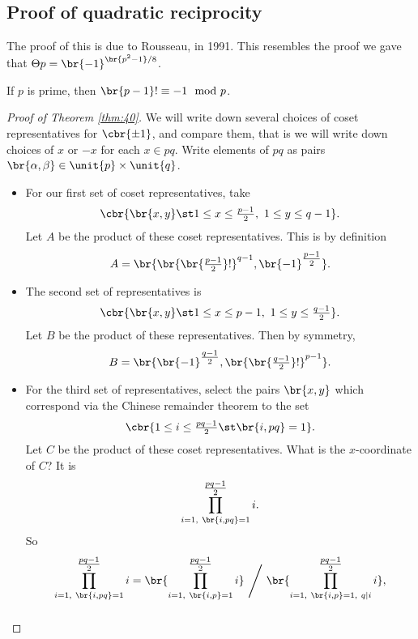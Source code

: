 \pagebreak

\subsection{Proof of quadratic reciprocity}


The proof of this is due to Rousseau, in 1991. This resembles the proof we gave that $ \symbol{2}{p} = \br{-1}^{\br{p^2 - 1} / 8} $.

\begin{theorem}
If $ p $ is prime, then $ \br{p - 1}! \equiv -1 \mod p $.
\end{theorem}

\begin{proof}[Proof of Theorem \ref{thm:40}]
We will write down several choices of coset representatives for $ \cbr{\pm 1} $, and compare them, that is we will write down choices of $ x $ or $ -x $ for each $ x \in \unit{pq} $. Write elements of $ \unit{pq} $ as pairs $ \br{\alpha, \beta} \in \unit{p} \times \unit{q} $.
\begin{itemize}
\item For our first set of coset representatives, take
$$ \cbr{\br{x, y} \st 1 \le x \le \tfrac{p - 1}{2}, \ 1 \le y \le q - 1}. $$
Let $ A $ be the product of these coset representatives. This is by definition
$$ A = \br{\br{\br{\tfrac{p - 1}{2}}!}^{q - 1}, \br{-1}^{\tfrac{p - 1}{2}}}. $$
\item The second set of representatives is
$$ \cbr{\br{x, y} \st 1 \le x \le p - 1, \ 1 \le y \le \tfrac{q - 1}{2}}. $$
Let $ B $ be the product of these representatives. Then by symmetry,
$$ B = \br{\br{-1}^{\tfrac{q - 1}{2}}, \br{\br{\tfrac{q - 1}{2}}!}^{p - 1}}. $$
\item For the third set of representatives, select the pairs $ \br{x, y} $ which correspond via the Chinese remainder theorem to the set
$$ \cbr{1 \le i \le \tfrac{pq - 1}{2} \st \br{i, pq} = 1}. $$
Let $ C $ be the product of these coset representatives. What is the $ x $-coordinate of $ C $? It is
$$ \prod_{i = 1, \ \br{i, pq} = 1}^{\tfrac{pq - 1}{2}} i. $$
So
\begin{equation}
\label{eq:1}
\prod_{i = 1, \ \br{i, pq} = 1}^{\tfrac{pq - 1}{2}} i = \br{\prod_{i = 1, \ \br{i, p} = 1}^{\tfrac{pq - 1}{2}} i} \ \Bigg/ \ \br{\prod_{i = 1, \ \br{i, p} = 1, \ q \mid i}^{\tfrac{pq - 1}{2}} i},
\end{equation}
\begin{equation}

\end{equation}
\end{itemize}
\end{proof}

